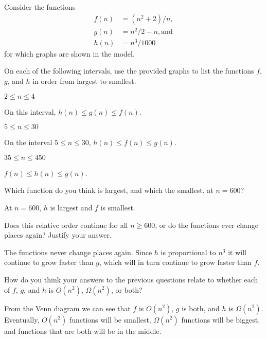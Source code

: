 \documentclass{tufte-handout}
\begin{document}
Consider the functions
\begin{align*}
  f(n) &= (n^2 + 2)/n, \\ g(n) &= n^2/2 - n, \text{and} \\ h(n) &= n^3/1000
\end{align*}
for which graphs are shown in the model.
\begin{questions}
\item On each of the following intervals, use the provided graphs to
  list the functions $f$, $g$, and $h$ in order from largest to
  smallest.
  \begin{subquestions}
  \item $2 \leq n \leq 4$
    \begin{answer}On this interval, $h(n) \leq g(n) \leq f(n)$.\end{answer}
  \item $5 \leq n \leq 30$
    \begin{answer}On the interval $5 \leq n \leq 30$, $h(n) \leq f(n) \leq g(n)$.\end{answer}
  \item $35 \leq n \leq 450$
    \begin{answer}$f(n) \leq h(n) \leq g(n)$.\end{answer}
  \end{subquestions}
\item Which function do you think is largest, and which the smallest,
  at $n = 600$?
  \begin{answer}At $n = 600$, $h$ is largest and $f$ is smallest.\end{answer}

\item Does this relative order continue for all $n \geq 600$, or do
  the functions ever change places again?  Justify your answer.
  \begin{answer}The functions never change places again.  Since $h$
    is proportional to $n^3$ it will continue to grow faster than
    $g$, which will in turn continue to grow faster than
    $f$.\end{answer}
\item How do you think your answers to the previous questions relate
  to whether each of $f$, $g$, and $h$ is $O(n^2)$, $\Omega(n^2)$, or
  both?
  \begin{answer}
    From the Venn diagram we can see that $f$ is $O(n^2)$, $g$ is
    both, and $h$ is $\Omega(n^2)$.  Eventually, $O(n^2)$ functions
    will be smallest, $\Omega(n^2)$ functions will be biggest, and
    functions that are both will be in the middle.
  \end{answer}
\end{questions}
\end{document}
